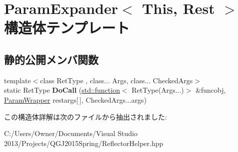 \hypertarget{struct_param_expander}{}\section{Param\+Expander$<$ This, Rest $>$ 構造体テンプレート}
\label{struct_param_expander}
\subsection*{静的公開メンバ関数}
\begin{DoxyCompactItemize}
\item 
{\footnotesize template$<$class Ret\+Type , class... Args, class... Checked\+Args$>$ }\\static Ret\+Type {\bfseries Do\+Call} (\hyperlink{classstd_1_1function}{std\+::function}$<$ Ret\+Type(Args...)$>$ \&funcobj, \hyperlink{struct_param_wrapper}{Param\+Wrapper} restargs\mbox{[}$\,$\mbox{]}, Checked\+Args...\+args)\hypertarget{struct_param_expander_a52118c8f1c12ba1080a8aa6453f62f03}{}\label{struct_param_expander_a52118c8f1c12ba1080a8aa6453f62f03}

\end{DoxyCompactItemize}


この構造体詳解は次のファイルから抽出されました\+:\begin{DoxyCompactItemize}
\item 
C\+:/\+Users/\+Owner/\+Documents/\+Visual Studio 2013/\+Projects/\+Q\+G\+J2015\+Spring/Reflector\+Helper.\+hpp\end{DoxyCompactItemize}
